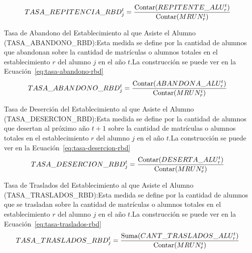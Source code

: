 \begin{longdescription}
\begin{longdescription}
             \begin{equation}
              \centering
                TASA\_REPITENCIA\_RBD_{j}^{t} = \frac{\mbox{Contar}(REPITENTE\_ALU_{r}^{t})}
                {\mbox{Contar}(MRUN_{r}^{t})}
                \label{eq:tasa-repitencia-rbd}
              \end{equation}
              \item[Tasa de Abandono del Establecimiento al que Asiste el Alumno](TASA\_ABANDONO\_RBD):Esta medida se define por la cantidad de alumnos que abandonan sobre la cantidad de matrículas o alumnos totales en el establecimiento $r$ del alumno $j$ en el año $t$.La construcción se puede ver en la Ecuación~\ref{eq:tasa-abandono-rbd}
              \begin{equation}
              \centering
                TASA\_ABANDONO\_RBD_{j}^{t} = \frac{\mbox{Contar}(ABANDONA\_ALU_{r}^{t})}
                {\mbox{Contar}(MRUN_{r}^{t})}
                \label{eq:tasa-abandono-rbd}
              \end{equation}
              \item[Tasa de Deserción del Establecimiento al que Asiste el Alumno](TASA\_DESERCION\_RBD):Esta medida se define por la cantidad de alumnos que desertan al próximo año $t+1$ sobre la cantidad de matrículas o alumnos totales en el establecimiento $r$ del alumno $j$ en el año $t$.La construcción se puede ver en la Ecuación~\ref{eq:tasa-desercion-rbd}
             \begin{equation}
              \centering
                TASA\_DESERCION\_RBD_{j}^{t} = \frac{\mbox{Contar}(DESERTA\_ALU_{r}^{t})}
                {\mbox{Contar}(MRUN_{r}^{t})}
                \label{eq:tasa-desercion-rbd}
              \end{equation}
              \item[Tasa de Traslados del Establecimiento al que Asiste el Alumno](TASA\_TRASLADOS\_RBD):Esta medida se define por la cantidad de alumnos que se trasladan sobre la cantidad de matrículas o alumnos totales en el establecimiento $r$ del alumno $j$ en el año $t$.La construcción se puede ver en la Ecuación~\ref{eq:tasa-traslados-rbd}
              \begin{equation}
              \centering
                TASA\_TRASLADOS\_RBD_{j}^{t} = \frac{\mbox{Suma}(CANT\_TRASLADOS\_ALU_{r}^{t})}
                {\mbox{Contar}(MRUN_{r}^{t})}
                \label{eq:tasa-traslados-rbd}
              \end{equation}
            \end{longdescription}

\end{longdescription}
